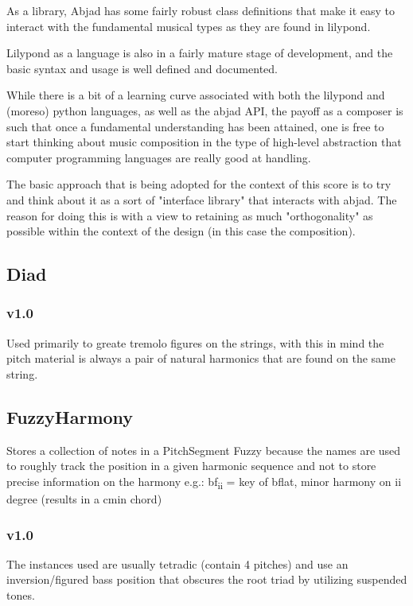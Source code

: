 \documentclass[11pt]{article}
\begin{document}
As a library, Abjad has some fairly robust class definitions that
make it easy to interact with the fundamental musical types as they
are found in lilypond. 

Lilypond as a language is also in a fairly mature stage of
development, and the basic syntax and usage is well defined and
documented. 

While there is a bit of a learning curve associated with both the
lilypond and (moreso) python languages, as well as the abjad API, the
payoff as a composer is such that once a fundamental understanding has
been attained, one is free to start thinking about music composition
in the type of high-level abstraction that computer programming
languages are really good at handling.  

The basic approach that is being adopted for the context of this score
is to try and think about it as a sort of "interface library" that
interacts with abjad. The reason for doing this is with a view to
retaining as much "orthogonality" as possible within the context of
the design (in this case the composition). 

\subsection{Diad}
\label{sec:orgd47b653}
\subsubsection{v1.0}
\label{sec:org17e4638}
Used primarily to greate tremolo figures on the strings, with this in
mind the pitch material is always a pair of natural harmonics that are
found on the same string. 

\subsection{FuzzyHarmony}
\label{sec:org15491f5}
Stores a collection of notes in a PitchSegment Fuzzy because the names
are used to roughly track the position in a given harmonic sequence
and not to store precise information on the harmony e.g.: bf\textsubscript{ii} = key
of bflat, minor harmony on ii degree (results in a cmin chord)

\subsubsection{v1.0}
\label{sec:orgd38aa9d}
The instances used are usually tetradic (contain 4 pitches)
and use an inversion/figured bass position that obscures the root
triad by utilizing suspended tones.  
\end{document}
